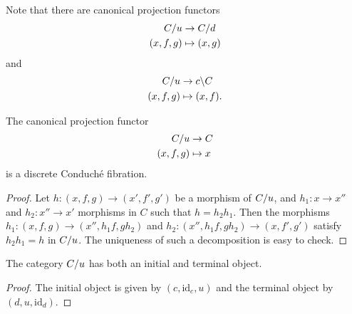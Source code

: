 \documentclass{amsart}
\newcommand{\id}{\mathrm{id}}
\begin{document}
  \begin{remark}
    Note that there are canonical projection functors
    \[
      \begin{aligned}
        \tr{C}{u} &\to \tr{C}{d}\\
        (x,f,g) &\mapsto (x,g)
      \end{aligned}
    \]
    and
    \[
      \begin{aligned}
        \tr{C}{u} &\to \cotr{C}{c}\\
        (x,f,g) &\mapsto (x,f).
      \end{aligned}
    \]
  \end{remark}
  \begin{lemma}\label{lemma:projcond}
    The canonical projection functor
    \[
      \begin{aligned}
        \tr{C}{u} &\to C\\
        (x,f,g) &\mapsto x
      \end{aligned}
    \]
    is a discrete Conduché fibration. 
  \end{lemma}
  \begin{proof}
    Let $h \colon (x,f,g) \to (x',f',g')$ be a morphism of
    $\tr{C}{u}$, and $h_1 \colon x \to x''$ and $h_2 \colon x'' \to
    x'$ morphisms in $C$ such that $h=h_2h_1$. Then the morphisms $h_1
    \colon (x,f,g) \to (x'',h_1f,gh_2)$ and $h_2 \colon
    (x'',h_1f,gh_2) \to (x,f',g')$ satisfy $h_2h_1=h$ in
    $\tr{C}{u}$. The uniqueness of such a decomposition is easy to check.
  \end{proof}
  \begin{lemma}
    The category $\tr{C}{u}$ has both an initial and terminal object.
  \end{lemma}
  \begin{proof}
    The initial object is given by $(c,\id_{c},u)$ and the terminal
    object by $(d,u,\id_{d})$.
  \end{proof}
\end{document}

